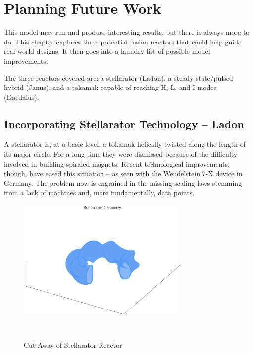 %
%
%
%
%
%
%
%

\chapter{Planning Future Work}

This model may run and produce interesting results, but there is always more to do. This chapter explores three potential fusion reactors that could help guide real world designs. It then goes into a laundry list of possible model improvements.

The three reactors covered are: a stellarator (Ladon), a steady-state/pulsed hybrid (Janus), and a tokamak capable of reaching H, L, and I modes (Daedalus). 

\section{Incorporating Stellarator Technology -- Ladon}

A stellarator is, at a basic level, a tokamak helically twisted along the length of its major circle. For a long time they were dismissed because of the difficulty involved in building spiraled magnets.  Recent technological improvements, though, have eased this situation -- as seen with the Wendelstein 7-X device in Germany. The problem now is engrained in the missing scaling laws stemming from a lack of machines and, more fundamentally, data points.

\begin{figure}
	\centering
	\includegraphics[width=0.75\textwidth]{images/stellarator}
	\caption{Cut-Away of Stellarator Reactor} ~\\
\end{figure}

